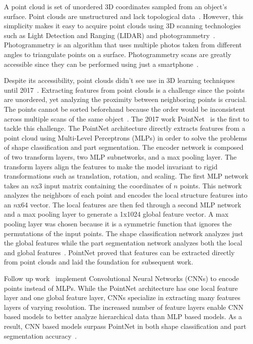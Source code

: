 A point cloud is set of unordered 3D coordinates sampled from an object's surface. Point clouds are unstructured and lack topological data~\cite{Xiao2020}. However, this simplicity makes it easy to acquire point clouds using 3D scanning technologies such as Light Detection and Ranging (LIDAR) and photogrammetry~\cite{Leberl2010}. Photogrammetry is an algorithm that uses multiple photos taken from different angles to triangulate points on a surface. Photogrammetry scans are greatly accessible since they can be performed using just a smartphone~\cite{Micheletti2015}.

Despite its accessibility, point clouds didn't see use in 3D learning techniques until 2017~\cite{Xiao2020}. Extracting features from point clouds is a challenge since the points are unordered, yet analyzing the proximity between neighboring points is crucial. The points cannot be sorted beforehand because the order would be inconsistent across multiple scans of the same object~\cite{Qi2017}. The 2017 work PointNet~\cite{Qi2017} is the first to tackle this challenge. The PointNet architecture directly extracts features from a point cloud using Multi-Level Perceptrons (MLPs) in order to solve the problems of shape classification and part segmentation. The encoder network is composed of two transform layers, two MLP subnetworks, and a max pooling layer. The transform layers align the features to make the model invariant to rigid transformations such as translation, rotation, and scaling. The first MLP network takes an $n$x3 input matrix containing the coordinates of $n$ points. This network analyzes the neighbors of each point and encodes the local structure features into an $n$x64 vector. The local features are then fed through a second MLP network and a max pooling layer to generate a 1x1024 global feature vector. A max pooling layer was chosen because it is a symmetric function that ignores the permutations of the input points. The shape classification network analyzes just the global features while the part segmentation network analyzes both the local and global features~\cite{Qi2017}. PointNet proved that features can be extracted directly from point clouds and laid the foundation for subsequent work.

Follow up work~\cite{Xu2018, Li2018, Wu2019} implement Convolutional Neural Networks (CNNs) to encode points instead of MLPs. While the PointNet architecture has one local feature layer and one global feature layer, CNNs specialize in extracting many features layers of varying resolution. The increased number of feature layers enable CNN based models to better analyze hierarchical data than MLP based models. As a result, CNN based models surpass PointNet in both shape classification and part segmentation accuracy~\cite{Wu2019}.

